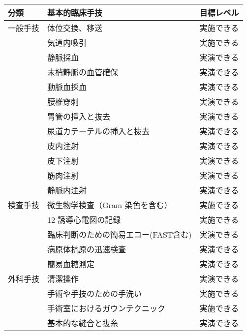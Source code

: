\begin{xltabular}{\linewidth}{XXX}
\caption{\label{tbl:skills}} \\
\toprule
分類 & 基本的臨床手技 & 目標レベル \\
\midrule
\endhead
一般手技 & 体位交換、移送 & 実施できる \\
 & 気道内吸引 & 実施できる \\
 & 静脈採血 & 実演できる \\
 & 末梢静脈の血管確保 & 実演できる \\
 & 動脈血採血 & 実演できる \\
 & 腰椎穿刺 & 実演できる \\
 & 胃管の挿入と抜去 & 実演できる \\
 & 尿道カテーテルの挿入と抜去 & 実演できる \\
 & 皮内注射 & 実演できる \\
 & 皮下注射 & 実演できる \\
 & 筋肉注射 & 実演できる \\
 & 静脈内注射 & 実演できる \\
検査手技 & 微生物学検査（Gram 染色を含む） & 実施できる \\
 & 12 誘導心電図の記録 & 実施できる \\
 & 臨床判断のための簡易エコー(FAST含む) & 実演できる \\
 & 病原体抗原の迅速検査 & 実演できる \\
 & 簡易血糖測定 & 実演できる \\
外科手技 & 清潔操作 & 実演できる \\
 & 手術や手技のための手洗い & 実施できる \\
 & 手術室におけるガウンテクニック & 実施できる \\
 & 基本的な縫合と抜糸 & 実演できる \\
\bottomrule
\end{xltabular}



